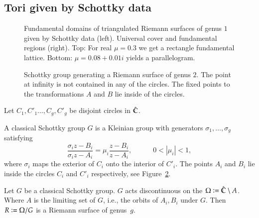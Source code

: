 \documentclass[Thesis]{subfiles}
\begin{document}
\subsection{Tori given by Schottky data}
\label{sec:tori_schottky}
\begin{figure}
\centering
{}
\caption{
Fundamental domains of triangulated Riemann surfaces of genus $1$ given by Schottky data (left). 
Universal cover and fundamental regions (right). 
Top: For real $\mu=0.3$ we get a rectangle fundamental lattice. 
Bottom: $\mu=0.08+0.01i$ yields a parallelogram.
}
\label{fig:schottky_g1}
\end{figure}

\begin{figure} 
\centering 
\scalebox{1.0}{}
\caption{
Schottky group generating a Riemann surface of genus $2$. 
The point at infinity is not contained in any of the circles. 
The fixed points to the transformations $A$ and $B$ lie inside of the circles.
} 
\label{fig:schottky_group}
\end{figure}

Let $C_1,C'_1\ldots,C_g,C'_g$ be disjoint circles in $\hat{\mathbb C}$.
\begin{definition} A classical Schottky group $G$ is a Kleinian group with generators $\sigma_1,\ldots,\sigma_g$ satisfying
\begin{equation}
\frac{\sigma_i z - B_i}{\sigma_i z - A_i} = \mu_i \frac{z - B_i}{z - A_i},
\quad\quad\quad 0 < \left|\mu_i\right|<1,
\end{equation}
where $\sigma_i$ maps the exterior of $C_i$ onto the interior of $C'_i$. The points $A_i$ and $B_i$ lie inside the circles $C_i$ and $C'_i$ respectively, see Figure~\ref{fig:schottky_group}.
\end{definition}
Let $G$ be a classical Schottky group. $G$ acts discontinuous on the $\Omega\vcentcolon=\hat{\mathbb C}\setminus A$. 
Where $A$ is the limiting set of $G$, i.e., the orbits of $A_i, B_i$ under $G$.
Then $R\vcentcolon=\Omega/G$ is a Riemann surface of genus~$g$.
\end{document}
